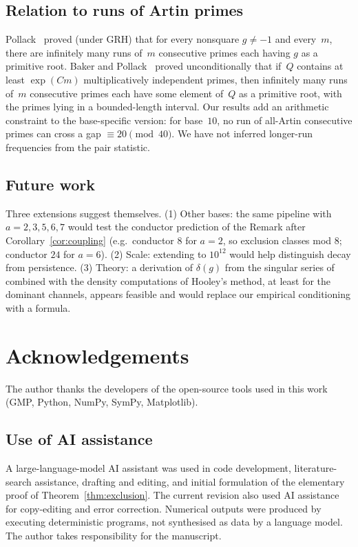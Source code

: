 \documentclass[11pt]{amsart}
\theoremstyle{definition}
\begin{document}
\subsection*{Relation to runs of Artin primes}
Pollack~\cite{Pollack2014} proved (under GRH) that for every nonsquare
$g \neq -1$ and every~$m$, there are infinitely many runs of~$m$ consecutive
primes each having $g$ as a primitive root. Baker and
Pollack~\cite{BakerPollack2016} proved unconditionally that if~$Q$ contains
at least $\exp(Cm)$ multiplicatively independent primes, then infinitely many
runs of~$m$ consecutive primes each have some element of~$Q$ as a primitive
root, with the primes lying in a bounded-length interval.
Our results add an arithmetic constraint to the base-specific version:
for base~$10$, no run of all-Artin consecutive primes can cross a gap
$\equiv 20 \pmod{40}$. We have not inferred longer-run frequencies from the
pair statistic.

\subsection*{Future work}
Three extensions suggest themselves. (1) Other bases: the same pipeline with
$a = 2, 3, 5, 6, 7$ would test the conductor prediction of the Remark after
Corollary~\ref{cor:coupling} (e.g.\ conductor $8$ for $a = 2$, so exclusion
classes mod $8$; conductor $24$ for $a = 6$). (2) Scale: extending to
$10^{12}$ would help distinguish decay from persistence. (3) Theory: a
derivation of $\delta(g)$ from the singular series of~\cite{HardyLittlewood1923}
combined with the density computations of Hooley's method, at least for the
dominant channels, appears feasible and would replace our empirical
conditioning with a formula.

\section*{Acknowledgements}
The author thanks the developers of the open-source tools used in this work
(GMP, Python, NumPy, SymPy, Matplotlib).

\subsection*{Use of AI assistance}
A large-language-model AI assistant was used in code development,
literature-search assistance, drafting and editing, and initial formulation
of the elementary proof of Theorem~\ref{thm:exclusion}. The current revision
also used AI assistance for copy-editing and error correction. Numerical
outputs were produced by executing deterministic programs, not synthesised as
data by a language model. The author takes responsibility for the manuscript.
\end{document}
